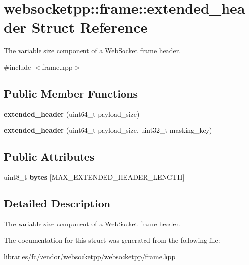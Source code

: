 \hypertarget{structwebsocketpp_1_1frame_1_1extended__header}{}\section{websocketpp\+:\+:frame\+:\+:extended\+\_\+header Struct Reference}
\label{structwebsocketpp_1_1frame_1_1extended__header}


The variable size component of a Web\+Socket frame header.  




{\ttfamily \#include $<$frame.\+hpp$>$}

\subsection*{Public Member Functions}
\begin{DoxyCompactItemize}
\item 
\mbox{\label{structwebsocketpp_1_1frame_1_1extended__header_a0fdbc1aaf81b56d61cc962fd724d3ffa}} 
{\bfseries extended\+\_\+header} (uint64\+\_\+t payload\+\_\+size)
\item 
\mbox{\label{structwebsocketpp_1_1frame_1_1extended__header_af94b7d3a232117abfbd2b876025ab451}} 
{\bfseries extended\+\_\+header} (uint64\+\_\+t payload\+\_\+size, uint32\+\_\+t masking\+\_\+key)
\end{DoxyCompactItemize}
\subsection*{Public Attributes}
\begin{DoxyCompactItemize}
\item 
\mbox{\label{structwebsocketpp_1_1frame_1_1extended__header_a64507c32b568d0894b2bf3a2513debd1}} 
uint8\+\_\+t {\bfseries bytes} \mbox{[}M\+A\+X\+\_\+\+E\+X\+T\+E\+N\+D\+E\+D\+\_\+\+H\+E\+A\+D\+E\+R\+\_\+\+L\+E\+N\+G\+TH\mbox{]}
\end{DoxyCompactItemize}


\subsection{Detailed Description}
The variable size component of a Web\+Socket frame header. 

The documentation for this struct was generated from the following file\+:\begin{DoxyCompactItemize}
\item 
libraries/fc/vendor/websocketpp/websocketpp/frame.\+hpp\end{DoxyCompactItemize}
